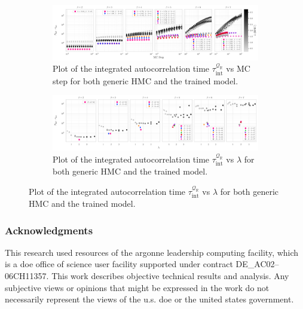 \documentclass{article} %
\begin{document}
%
\begin{figure}[htpb]
   \centering
   \begin{subfigure}{\textwidth}
      \includegraphics[width=\textwidth]{figures/autocorr_vs_mc_step1.pdf}
      \caption{Plot of the integrated autocorrelation time \(\tau_{\mathrm{int}}^{\mathcal{Q}_{\mathbb{R}}}\) vs
      MC step for both generic HMC and the trained model.}
   \end{subfigure}
   \begin{subfigure}{\textwidth}
      \includegraphics[width=\textwidth]{figures/autocorr_vs_traj_len1.pdf}
      \caption{Plot of the integrated autocorrelation time \(\tau_{\mathrm{int}}^{\mathcal{Q}_{\mathbb{R}}}\) vs
      \(\lambda\) for both generic HMC and the trained model.}
   \end{subfigure}
\end{figure}
%


\subsubsection*{Acknowledgments}
This research used resources of the argonne leadership computing facility, which is a doe office of science user
facility supported under contract DE\_AC02--06CH11357.%
%
This work describes objective technical results and analysis.
%
Any subjective views or opinions that might be expressed in the work do not necessarily represent the views of the u.s.
doe or the united states government.





\end{document}

